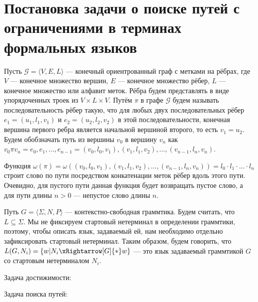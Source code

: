 \section{Постановка задачи о поиске путей с ограничениями в терминах формальных языков}

Пусть $\mathcal{G} = \langle V,E,L \rangle$ --- конечный ориентрованный граф с метками на рёбрах, где $V$ --- конечное множество вершин, $E$ --- конечное множество рёбер, $L$ --- конечное множество или алфавит меток.
Рёбра будем представлять в виде упорядоченных троек из $V \times L \times V$.
Путём $\pi$ в графе $\mathcal{G}$ будем называть последовательность рёбер такую, что для любых двух последовательных рёбер $e_1=(u_1,l_1,v_1)$ и $e_2=(u_2,l_2,v_2)$ в этой последовательности, конечная вершина первого ребра является начальной вершиной второго, то есть $v_1 = u_2$.
Будем обобзначать путь из вершины $v_0$ в вершину $v_n$ как $v_0 \pi v_n = e_0,e_1, \dots, e_{n-1} = (v_0, l_0, v_1),(v_1,l_1,v_2),\dots,(v_{n-1},l_n,v_n)$.

Функция $\omega(\pi) = \omega((v_0, l_0, v_1),(v_1,l_1,v_2),\dots,(v_{n-1},l_n,v_n)) = l_0 \cdot l_1 \cdot \ldots \cdot l_n $ строит слово по пути посредством конкатенации меток рёбер вдоль этого пути.
Очевидно, для пустого пути данная функция будет возвращать пустое слово, а для пути длины $n  > 0$ --- непустое слово длины $n$.

Путь $G = \langle \Sigma, N, P \rangle$ --- контекстно-свободная граммтика.
Будем считать, что $L \subseteq \Sigma$.
Мы не фиксируем стартовый нетерминал в определении граммтики, поэтому, чтобы описать язык, задаваемый ей, нам необходимо отдельно зафиксировать стартовый нетерминал.
Таким образом, будем говорить, что $L(G,N_i) = \{ w | N_i \xRightarrow[G]{*} w  \}$ --- это язык задаваемый граммтикой $G$ со стартовым нетерминалом $N_i$.

Задача достижимости:

Задача поиска путей:
